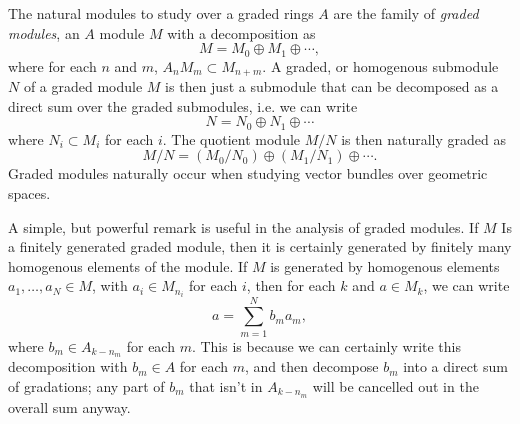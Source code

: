 The natural modules to study over a graded rings $A$ are the family of \emph{graded modules}, an $A$ module $M$ with a decomposition as
%
\[ M = M_0 \oplus M_1 \oplus \cdots, \]
%
where for each $n$ and $m$, $A_n M_m \subset M_{n+m}$. A graded, or homogenous submodule $N$ of a graded module $M$ is then just a submodule that can be decomposed as a direct sum over the graded submodules, i.e. we can write
%
\[ N = N_0 \oplus N_1 \oplus \cdots \]
%
where $N_i \subset M_i$ for each $i$. The quotient module $M/N$ is then naturally graded as
%
\[ M/N = (M_0/N_0) \oplus (M_1/N_1) \oplus \cdots. \]
%
Graded modules naturally occur when studying vector bundles over geometric spaces.

A simple, but powerful remark is useful in the analysis of graded modules. If $M$ Is a finitely generated graded module, then it is certainly generated by finitely many homogenous elements of the module. If $M$ is generated by homogenous elements $a_1, \dots, a_N \in M$, with $a_i \in M_{n_i}$ for each $i$, then for each $k$ and $a \in M_k$, we can write
%
\[ a = \sum_{m = 1}^N b_m a_m, \]
%
where $b_m \in A_{k - n_m}$ for each $m$. This is because we can certainly write this decomposition with $b_m \in A$ for each $m$, and then decompose $b_m$ into a direct sum of gradations; any part of $b_m$ that isn't in $A_{k-n_m}$ will be cancelled out in the overall sum anyway.

